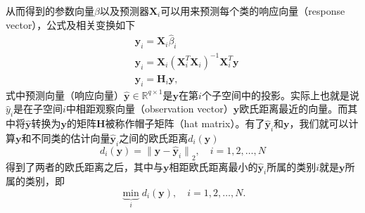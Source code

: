 \documentclass[UTF8]{ctexart}
\begin{document}
\par
从而得到的参数向量\(\beta\)以及预测器\(\mathbf{X}_i\)可以用来预测每个类的响应向量（response vector），公式及相关变换如下
\begin{equation}\label{eq-4}
    \begin{split}
        & \hat{\mathbf{y}}_i={\mathbf{X}_i\hat{\beta}_i}\\
        & \hat{\mathbf{y}}_i={\mathbf{X}_i{(\mathbf{X}^T_i\mathbf{X}_i)}^{-1}{\mathbf{X}^T_i\mathbf{y}}}\\
        & {\hat{\mathbf{y}}_i}={\mathbf{H}_i\mathbf{y}},
    \end{split}
\end{equation}
式中预测向量（响应向量）\(\hat{\mathbf{y}}\in\mathbb{R}^{q \times 1}\)是\(\mathbf{y}\)在第\(i\)个子空间中的投影。实际上也就是说\(\hat{y}_i\)是在子空间\(i\)中相距观察向量（observation vector）\(\mathbf{y}\)欧氏距离最近的向量。而其中将\(\hat{\mathbf{y}}\)转换为\(\mathbf{y}\)的矩阵\(\mathbf{H}\)被称作帽子矩阵（hat matrix）。有了\(\hat{\mathbf{y}}_i\)和\(\mathbf{y}\)，我们就可以计算\(\mathbf{y}\)和不同类的估计向量\({\hat{\mathbf{y}}}_i\)之间的欧氏距离\(d_i(\mathbf{y})\)
\begin{equation}\label{eq-5}
    d_i(\mathbf{y})={\|\mathbf{y}-{\hat{\mathbf{y}}}_i\|}_2,\quad i=1,2,\dots,N
\end{equation}
得到了两者的欧氏距离之后，其中与\(\mathbf{y}\)相距欧氏距离最小的\(\hat{\mathbf{y}}_i\)所属的类别\(i\)就是\(\mathbf{y}\)所属的类别，即
\begin{equation}
    \underbrace{\min}_i d_i(\mathbf{y}),\quad i=1,2,\dots,N.
\end{equation}
\end{document}
